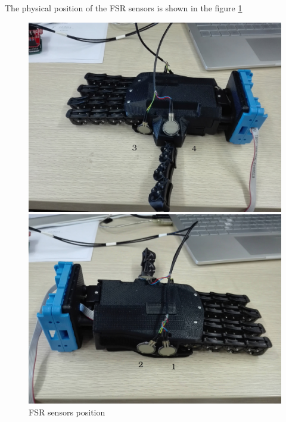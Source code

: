  The physical position of the FSR sensors is shown in the figure \ref{fig:sensors}
\begin{figure}[!tbp]
  \centering
  \begin{minipage}[b]{0.4\textwidth}
    \includegraphics[width=\textwidth]{Figure/qbhand1.jpg}
    
  \end{minipage}
  \hfill
  \begin{minipage}[b]{0.4\textwidth}
    \includegraphics[width=\textwidth]{Figure/qbhand2.jpg}
  \end{minipage}
  \label{fig:sensors}
  \caption{FSR sensors position}
\end{figure}

